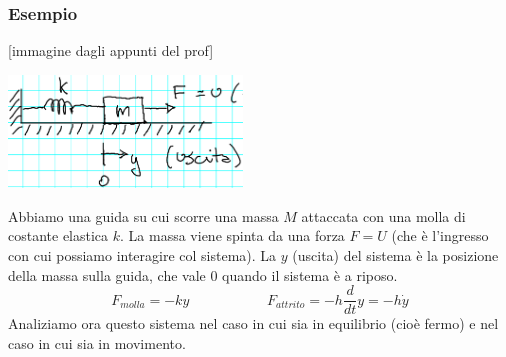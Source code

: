 \subsubsection{Esempio}
[immagine dagli appunti del prof]
\begin{center}
    \includegraphics[height=3cm]{../lezione1/img6.PNG}
\end{center}
Abbiamo una guida su cui scorre una massa $M$ attaccata con una molla di costante elastica $k$. La massa viene spinta da una forza $F = U$ (che è l'ingresso con cui possiamo interagire col sistema). La $y$ (uscita) del sistema è la posizione della massa sulla guida, che vale $0$ quando il sistema è a riposo.
\[
    F_{molla} = -ky \;\;\;\;\;\;\;\;\;\;\;\;\;\;\;\;\;\;\;\;F_{attrito} = - h \frac{d}{dt}y = -h \dot{y}
\]
Analiziamo ora questo sistema nel caso in cui sia in equilibrio (cioè fermo) e nel caso in cui sia in movimento.
